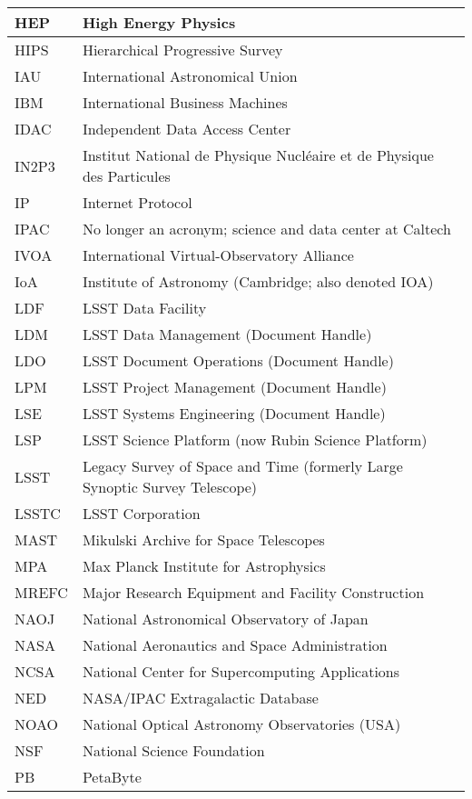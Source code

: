 \begin{longtable}{p{}p{}}
HEP &  High Energy Physics \\\hline
HIPS & Hierarchical Progressive Survey \\\hline
IAU & International Astronomical Union \\\hline
IBM & International Business Machines \\\hline
IDAC & Independent Data Access Center \\\hline
IN2P3 & Institut National de Physique Nucléaire et de Physique des Particules \\\hline
IP & Internet Protocol \\\hline
IPAC & No longer an acronym; science and data center at Caltech \\\hline
IVOA & International Virtual-Observatory Alliance \\\hline
IoA & Institute of Astronomy (Cambridge; also denoted IOA) \\\hline
LDF & LSST Data Facility \\\hline
LDM & LSST Data Management (Document Handle) \\\hline
LDO & LSST Document Operations (Document Handle) \\\hline
LPM & LSST Project Management (Document Handle) \\\hline
LSE & LSST Systems Engineering (Document Handle) \\\hline
LSP & LSST Science Platform (now Rubin Science Platform) \\\hline
LSST & Legacy Survey of Space and Time (formerly Large Synoptic Survey Telescope) \\\hline
LSSTC & LSST Corporation \\\hline
MAST & Mikulski Archive for Space Telescopes \\\hline
MPA & Max Planck Institute for Astrophysics \\\hline
MREFC & Major Research Equipment and Facility Construction \\\hline
NAOJ & National Astronomical Observatory of Japan \\\hline
NASA & National Aeronautics and Space Administration \\\hline
NCSA & National Center for Supercomputing Applications \\\hline
NED & NASA/IPAC Extragalactic Database \\\hline
NOAO & National Optical Astronomy Observatories (USA) \\\hline
NSF & National Science Foundation \\\hline
PB & PetaByte \\\hline

\end{longtable}
